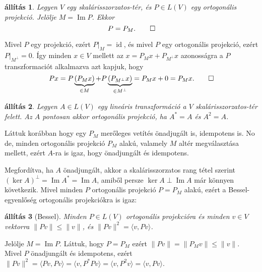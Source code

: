 \documentclass[9pt, a4paper, showtrims]{memoir}
\makeatletter
\renewenvironment{proof}[1][\proofname]
    {\par\pushQED{\qed}%
    \normalfont \topsep6\p@\@plus6\p@\relax
    \trivlist
    \item[\hskip\labelsep
        \itshape
    #1\@addpunct{:}]\ignorespaces}
    {\popQED\endtrivlist\@endpefalse}
\theoremstyle{plain}
\newtheorem{proposition}{állítás}[chapter]
\theoremstyle{remark}
\theoremstyle{definition}
\DeclareMathOperator{\id}{id}
\DeclareMathOperator{\im}{Im}
\newcommand{\ip}[2]{\langle#1,#2\rangle}
\makeatother
\begin{document}
\begin{proposition}
	Legyen $V$ egy skalárisszorzatos-tér,
	és $P\in L\left( V \right)$ egy ortogonális projekció.
	Jelölje $M=\im P$.
	Ekkor
	\[
		P=P_M.
		\qedhere
	\]
\end{proposition}
\begin{proof}
    Mivel $P$ egy projekció, ezért $P|_M=\id$, és mivel $P$ egy ortogonális projekció, 
    ezért $P|_{M^\perp}=0$.
    Így minden $x\in V$ mellett az $x=P_Mx+P_{M^\perp}x$ azonosságra a $P$ transzformaciót alkalmazva azt kapjuk, hogy
    \[
        Px
        =
        P\underbrace{\left( P_Mx \right)}_{\in M}+P\underbrace{\left( P_{M^\perp}x \right)}_{\in M^\perp}
        =
        P_Mx+0
        =
        P_Mx.
        \qedhere
    \]
\end{proof}
\begin{proposition}
	Legyen $A\in L\left( V \right)$ egy lineáris transzformáció a $V$ skalárisszorzatos-tér felett.
	Az $A$ pontosan akkor ortogonális projekció, ha $A^\ast=A$ és $A^2=A$.
\end{proposition}
\begin{proof}
	Láttuk korábban hogy egy $P_M$ merőleges vetítés önadjugált is, idempotens is.
	No de, minden ortogonális projekció $P_M$ alakú,
	valamely $M$ altér megválasztása mellett, ezért $A$-ra is igaz, hogy önadjungált és idempotens.

	Megfordítva, ha $A$ önadjungált, akkor a skalárisszorzatos rang tétel szerint $(\ker A)^\perp=\im A^\ast=\im A$,
	amiből persze $\ker A\perp\im A$ már könnyen következik.
\end{proof}
Mivel minden $P$ ortogonális projekció $P=P_M$ alakú,
ezért a Bessel-egyenlőség ortogonális projekciókra is igaz:
\begin{proposition}[Bessel]
	Minden  $P\in L\left( V \right)$ ortogonális projekcióra és minden $v\in V$ vektorra
	\(
	\|Pv\|\leq\|v\|
	\),
    és
    \(
    \|Pv\|^2=\ip{v}{Pv}
    \).
\end{proposition}
\begin{proof}
	Jelölje $M=\im P$.
    Láttuk, hogy $P=P_M$ ezért
	\(
	\|Pv\|
	=
	\|P_Mv\|
	\leq
	\|v\|.
	\)
    Mivel $P$ önadjungált és idempotens, 
    ezért
    \(
    \|Pv\|^2=\ip{Pv}{Pv}=\ip{v}{P^\ast Pv}=\ip{v}{P^2v}=\ip{v}{Pv}
    \).
\end{proof}
\end{document}
